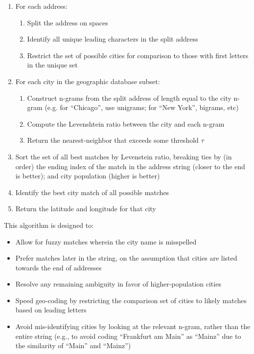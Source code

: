 \documentclass[11pt]{article}
\begin{document}
\begin{enumerate}
\item For each address:
  \begin{enumerate}
  \item Split the address on spaces
  \item Identify all unique leading characters in the split address
  \item Restrict the set of possible cities for comparison to those
    with first letters in the unique set
  \end{enumerate}
\item For each city in the geographic database subset:
  \begin{enumerate}
  \item Construct n-grams from the split address of length equal to
    the city n-gram (e.g. for ``Chicago'', use unigrams; for ``New
    York'', bigrams, etc)
  \item Compute the Levenshtein ratio between the city and each n-gram
  \item Return the nearest-neighbor that exceeds some threshold $\tau$
  \end{enumerate}
\item Sort the set of all best matches by Levenstein ratio, breaking
  ties by (in order) the ending index of the match in the address
  string (closer to the end is better); and city population (higher is
  better)
\item Identify the best city match of all possible matches
\item Return the latitude and longitude for that city
\end{enumerate}

This algorithm is designed to:
\begin{itemize}
\item Allow for fuzzy matches wherein the city name is misspelled
\item Prefer matches later in the string, on the assumption that
  cities are listed towards the end of addresses
\item Resolve any remaining ambiguity in favor of higher-population cities
\item Speed geo-coding by restricting the comparison set of cities to
  likely matches based on leading letters
\item Avoid mis-identifying cities by looking at the relevant n-gram,
  rather than the entire string (e.g., to avoid coding ``Frankfurt am
  Main'' as ``Mainz'' due to the similarity of ``Main'' and ``Mainz'')
\end{itemize}
\end{document}
